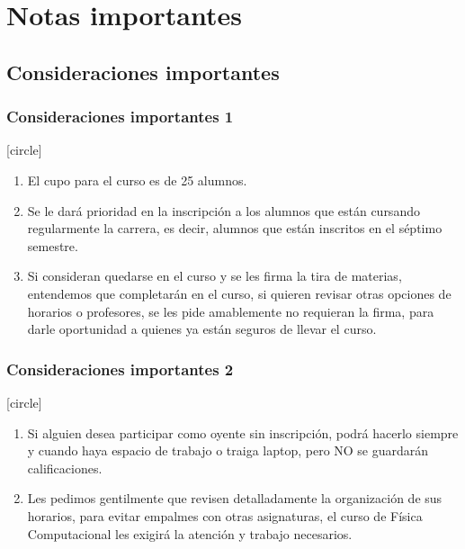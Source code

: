 \section{Notas importantes}
\subsection{Consideraciones importantes}
\begin{frame}
\frametitle{Consideraciones importantes 1}
\fontsize{12}{12}
[circle]
\begin{enumerate}[<+->]
\item El cupo para el curso es de 25 alumnos.
\item Se le dará prioridad en la inscripción a los alumnos que están cursando regularmente la carrera, es decir, alumnos que están inscritos en el séptimo semestre.
\item Si consideran quedarse en el curso y se les firma la tira de materias, entendemos que completarán en el curso, si quieren revisar otras opciones de horarios o profesores, se les pide amablemente no requieran la firma, para darle oportunidad a quienes ya están seguros de llevar el curso.
\seti
\end{enumerate}
\end{frame}
\begin{frame}
\frametitle{Consideraciones importantes 2}
\fontsize{12}{12}
[circle]
\begin{enumerate}[<+->]
\conti
\item Si alguien desea participar como oyente sin inscripción, podrá hacerlo siempre y cuando haya espacio de trabajo o traiga laptop, pero NO se guardarán calificaciones.
\item Les pedimos gentilmente que revisen detalladamente la organización de sus horarios, para evitar empalmes con otras asignaturas, el curso de Física Computacional les exigirá la atención y trabajo necesarios.
\end{enumerate}
\end{frame}
